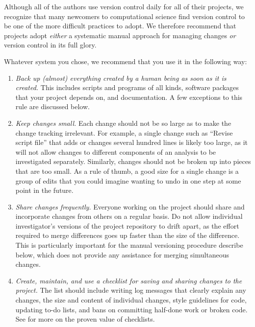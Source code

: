 \documentclass[10pt]{article}
\newcommand{\recommend}[1]{\textit{#1}}
\begin{document}
Although all of the authors use version control daily for all of their
projects, we recognize that many newcomers to computational science
find version control to be one of the more difficult practices to
adopt.  We therefore recommend that projects adopt \emph{either} a
systematic manual approach for managing changes \emph{or} version
control in its full glory.   

Whatever system you chose, we recommend that you use it in the following way:

\begin{enumerate}

\item
  \recommend{Back up (almost) everything created by a human being as
    soon as it is created.} This includes scripts and programs of all
  kinds, software packages that your project depends on, and
  documentation. A few exceptions to this rule are discussed below.

\item
  \recommend{Keep changes small.}  Each change should not be so large
  as to make the change tracking irrelevant. For example, a single
  change such as ``Revise script file'' that adds or changes several
  hundred lines is likely too large, as it will not allow changes to
  different components of an analysis to be investigated
  separately. Similarly, changes should not be broken up into pieces
  that are too small. As a rule of thumb, a good size for a single change is
  a group of edits that you could imagine wanting to undo in one step
  at some point in the future.

\item
  \recommend{Share changes frequently.} Everyone working on the
  project should share and incorporate changes from others on a
  regular basis. Do not allow individual investigator's versions of
  the project repository to drift apart, as the effort required to
  merge differences goes up faster than the size of the
  difference. This is particularly important for the manual versioning
  procedure describe below, which does not provide any
  assistance for merging simultaneous changes.

\item
  \recommend{Create, maintain, and use a checklist for saving and
    sharing changes to the project.}  The list should include writing
  log messages that clearly explain any changes, the size and content
  of individual changes, style guidelines for code, updating to-do
  lists, and bans on committing half-done work or broken code.  See
  \cite{gawande2011} for more on the proven value of checklists.

\end{enumerate}
\end{document}
